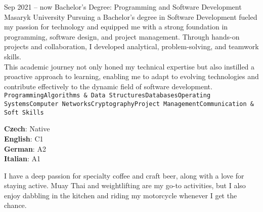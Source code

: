 \documentclass[9pt]{cv}
\begin{document}

\begin{entrylist}
	\entry
		{Sep 2021 -- now}
		{Bachelor's Degree: Programming and Software Development}
		{Masaryk University}
        {Pursuing a Bachelor's degree in Software Development fueled my passion for technology and equipped me with a strong foundation in programming, software design, and project management. Through hands-on projects and collaboration, I developed analytical, problem-solving, and teamwork skills.\\ This academic journey not only honed my technical expertise but also instilled a proactive approach to learning, enabling me to adapt to evolving technologies and contribute effectively to the dynamic field of software development.\\ \texttt{Programming}\slashsep\texttt{Algorithms \& Data Structures}\slashsep\texttt{Databases}\slashsep\texttt{Operating Systems}\slashsep\texttt{Computer Networks}\slashsep\texttt{Cryptography}\slashsep\texttt{Project Management}\slashsep\texttt{Communication \& Soft Skills}}
\end{entrylist}

\begin{minipage}[t]{0.3\textwidth}
	\vspace{-\baselineskip} %


	\textbf{Czech}: Native\\
	\textbf{English}: C1\\
	\textbf{German}: A2\\
	\textbf{Italian}: A1\\
\end{minipage}
\hfill
\begin{minipage}[t]{0.3\textwidth}
	\vspace{-\baselineskip} %
	

    I have a deep passion for specialty coffee and craft beer, along with a love for staying active. Muay Thai and weightlifting are my go-to activities, but I also enjoy dabbling in the kitchen and riding my motorcycle whenever I get the chance.
\end{minipage}
\hfill
% 	
% 	
\end{document}
